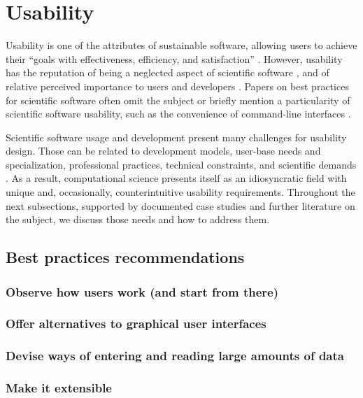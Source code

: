 \section{Usability}
\label{sec:usability}

Usability is one of the attributes of sustainable software, allowing users to achieve their “goals with effectiveness, efficiency, and satisfaction” \cite[p.3]{Venters_WSSSPE}. However, usability has the reputation of being a neglected aspect of scientific software \cite{Ahmed:2014}, and of relative perceived importance to users and developers \cite{Nguyen-Hoan:2010, Hucka:2016}. Papers on best practices for scientific software often omit the subject \cite{Stodden_WSSSPE, Wilson:2016} or briefly mention a particularity of scientific software usability, such as the convenience of command-line interfaces \cite{bestprSC}. 

Scientific software usage and development present many challenges for usability design. Those can be related to development models, user-base needs and specialization, professional practices, technical constraints, and scientific demands \cite{Queiroz:2016}. As a result, computational science presents itself as an idiosyncratic field with unique and, occasionally, counterintuitive usability requirements. Throughout the next subsections, supported by documented case studies and further literature on the subject, we discuss those needs and how to address them. 

\subsection{Best practices recommendations}

\subsubsection{Observe how users work (and start from there)}

\subsubsection{Offer alternatives to graphical user interfaces}

\subsubsection{Devise ways of entering and reading large amounts of data}

\subsubsection{Make it extensible}

